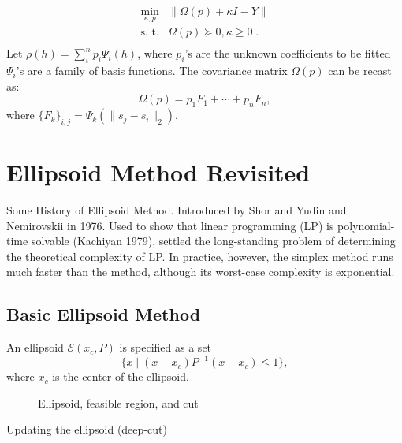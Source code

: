 \documentclass[final,leqno]{siamltex}
\begin{document}
\[\begin{array}{ll}
   \min_{\kappa, p}   & \| \Omega(p) + \kappa I - Y \| \\
   \text{s. t.} & \Omega(p) \succcurlyeq 0,  \kappa \ge 0 \; .\\
  \end{array}
\]
Let \(\rho(h) = \sum_i^n p_i \Psi_i(h)\), where \(p_i\)'s are the unknown coefficients to be fitted \(\Psi_i\)'s are a family of basis functions. The covariance matrix \(\Omega(p)\) can be recast as:
\[\Omega(p) = p_1 F_1 + \cdots + p_n F_n, \]
where \(\{F_k\}_{i,j} =\Psi_k( \| s_j - s_i \|_2)\).

\hypertarget{sec:ellipsoid-method-revisited}{%
\section{Ellipsoid Method Revisited}\label{sec:ellipsoid-method-revisited}}

Some History of Ellipsoid Method. Introduced by Shor and Yudin and Nemirovskii in 1976. Used to show that linear programming (LP) is polynomial-time solvable (Kachiyan 1979), settled the long-standing problem of determining the theoretical complexity of LP. In practice, however, the simplex method runs much faster than the method, although its worst-case complexity is exponential.

\hypertarget{sec:basic-ellipsoid-method}{%
\subsection{Basic Ellipsoid Method}\label{sec:basic-ellipsoid-method}}

An ellipsoid \(\mathcal{E}(x_c, P)\) is specified as a set
\[\{x \mid (x-x_c)P^{-1}(x-x_c) \leq 1 \}, \]
where \(x_c\) is the center of the ellipsoid.

\begin{figure}
\caption{Ellipsoid, feasible region, and cut}
\label{fig:ellipsoid}
\end{figure}

Updating the ellipsoid (deep-cut)
\end{document}
